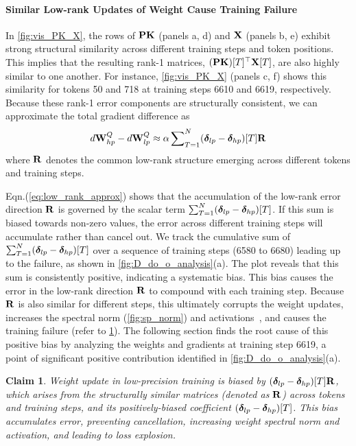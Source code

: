 \documentclass{article} %
\newtheorem{claim}{Claim}
\begin{document}
\paragraph{Similar Low-rank Updates of Weight Cause Training Failure} In \cref{fig:vis_PK_X}, the rows of ${\mathbf{P}}{\mathbf{K}}$ (panels a, d) and ${\mathbf{X}}$ (panels b, e) exhibit strong structural similarity across different training steps and token positions. This implies that the resulting rank-1 matrices, $({\mathbf{P}} {\mathbf{K}})[T]^\top {\mathbf{X}}[T]$, are also highly similar to one another. For instance, \cref{fig:vis_PK_X} (panels c, f) shows this similarity for tokens 50 and 718 at training steps 6610 and 6619, respectively. Because these rank-1 error components are structurally consistent, we can approximate the total gradient difference as 
\begin{equation}\label{eq:low_rank_approx}
  d{\mathbf{W}}^Q_{hp} - d{\mathbf{W}}^Q_{lp} \approx \alpha \sum\nolimits_{T=1}^N ({\boldsymbol{\delta}}_{lp} - {\boldsymbol{\delta}}_{hp})[T] {\mathbf{R}}
\end{equation}
where ${\mathbf{R}}$ denotes the common low-rank structure emerging across different tokens and training steps.

Eqn.(\ref{eq:low_rank_approx}) shows that the accumulation of the low-rank error direction ${\mathbf{R}}$ is governed by the scalar term $\sum_{T=1}^N ({\boldsymbol{\delta}}_{lp} - {\boldsymbol{\delta}}_{hp})[T]$. If this sum is biased towards non-zero values, the error across different training steps will accumulate rather than cancel out. We track the cumulative sum of $\sum_{T=1}^N ({\boldsymbol{\delta}}_{lp} - {\boldsymbol{\delta}}_{hp})[T]$ over a sequence of training steps (6580 to 6680) leading up to the failure, as shown in \cref{fig:D_do_o_analysis}(a). The plot reveals that this sum is consistently positive, indicating a systematic bias. This bias causes the error in the low-rank direction ${\mathbf{R}}$ to compound with each training step. Because ${\mathbf{R}}$ is also similar for different steps, this ultimately corrupts the weight updates, increases the spectral norm (\cref{fig:sp_norm}) and activations~\citep{yang2023spectral,rybakov2024methods}, and causes the training failure (refer to \cref{claim2}). The following section finds the root cause of this positive bias by analyzing the weights and gradients at training step 6619, a point of significant positive contribution identified in \cref{fig:D_do_o_analysis}(a).


\begin{tcolorbox}[
  colback=cyan!5!white,      
  colframe=black!100,
  boxrule=0.4pt,
  arc=3pt,
  left=5pt, right=5pt,
  top=5pt, bottom=5pt,
  width=0.95\linewidth,
  coltitle=black,
  center
]
\begin{claim}\label{claim2}
  Weight update in low-precision training is biased by $({\boldsymbol{\delta}}_{lp} - {\boldsymbol{\delta}}_{hp})[T]{\mathbf{R}}$, which arises from the structurally similar matrices (denoted as ${\mathbf{R}}$) across tokens and training steps, and its positively-biased coefficient $({\boldsymbol{\delta}}_{lp} - {\boldsymbol{\delta}}_{hp})[T]$. This bias accumulates error, preventing cancellation, increasing weight spectral norm and activation, and leading to loss explosion.
\end{claim}
\end{tcolorbox}
\end{document}
